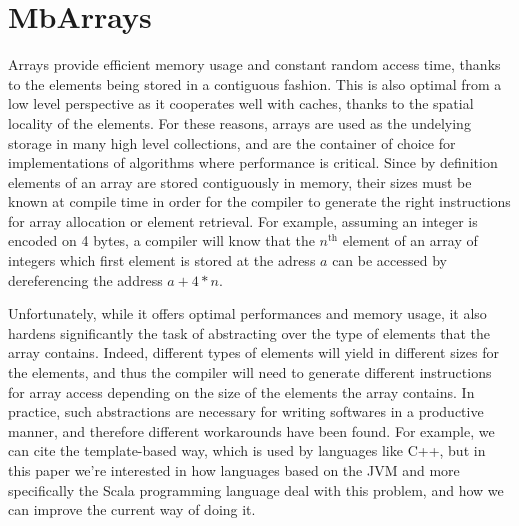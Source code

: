 \section{MbArrays}
\label{sec:mbarrays}

Arrays provide efficient memory usage and constant random access time, thanks to the elements being stored in a contiguous fashion. This is also optimal from a low level perspective as it cooperates well with caches, thanks to the spatial locality of the elements. For these reasons, arrays are used as the undelying storage in many high level collections, and are the container of choice for implementations of algorithms where performance is critical. Since by definition elements of an array are stored contiguously in memory, their sizes must be known at compile time in order for the compiler to generate the right instructions for array allocation or element retrieval. For example, assuming an integer is encoded on 4 bytes, a compiler will know that the $n^\text{th}$ element of an array of integers which first element is stored at the adress $a$ can be accessed by dereferencing the address $a + 4*n$.


Unfortunately, while it offers optimal performances and memory usage, it also hardens significantly the task of abstracting over the type of elements that the array contains. Indeed, different types of elements will yield in different sizes for the elements, and thus the compiler will need to generate different instructions for array access depending on the size of the elements the array contains. In practice, such abstractions are necessary for writing softwares in a productive manner, and therefore different workarounds have been found. For example, we can cite the template-based way, which is used by languages like C++, but in this paper we're interested in how languages based on the JVM and more specifically the Scala programming language deal with this problem, and how we can improve the current way of doing it.

